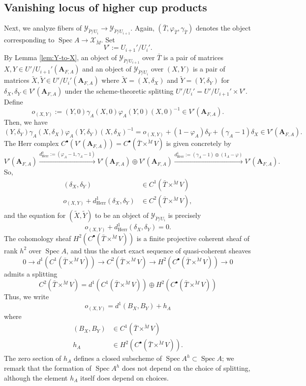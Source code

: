 \documentclass[11pt]{amsart}
\numberwithin{thm}{section}
\numberwithin{lem}{section}
\numberwithin{cor}{section}
\numberwithin{prop}{section}
\numberwithin{exam}{section}
\numberwithin{dfn}{section}
\newcommand{\wt}[1]{\widetilde{#1}}
\newcommand{\Herr}{{\operatorname{Herr}}}
\newcommand{\spec}{\operatorname{Spec}}
\newcommand{\cX}{\mathcal{X}}
\newcommand{\cY}{\mathcal{Y}}
\newcommand{\bM}{\breve{M}}
\newcommand{\bP}{\breve{P}}
\newcommand{\A}{\mathbf{A}}
\begin{document}
\subsection{Vanishing locus of higher cup products}
Next, we analyze fibers of
$\cY_{\bP/U_i}\to \cY_{\bP/U_{i+1}}$.
Again, $(\bar T, \varphi_{\bar T}, \gamma_{\bar T})$
denotes the object corresponding to
$\spec A\to \cX_{\bM}$.
Set \[
V':=U_{i+1}'/U_i'.\]
By Lemma \ref{lem:Y-to-X},
an object 
of $\cY_{\bP/U_{i+1}}$ over $\bar T$
is a pair of matrices
$X, Y\in U'/U_{i+1}'(\A_{F,A})$
and
an object 
of $\cY_{\bP/U_{i}}$ over $(X, Y)$
is a pair of matrices
$\wt X, \wt Y\in U'/U_{i}'(\A_{F,A})$
where
$\wt X=(X, \delta_X)$
and
$\wt Y=(Y, \delta_Y)$
for $\delta_X, \delta_Y\in V'(\A_{F, A})$
under the scheme-theoretic splitting
$U'/U_{i}'=U'/U_{i+1}'\times V'$.
Define
\[
o_{(X,Y)}:=
(Y,0)\gamma_A(X,0)
\varphi_A(Y,0)
(X,0)^{-1}
\in V'(\A_{F,A}).
\]
Then, we have
\[
(Y,\delta_Y)\gamma_A(X,\delta_X)
\varphi_A(Y,\delta_Y)
(X,\delta_X)^{-1}
=o_{(X,Y)}
+
(1-\varphi_A)\delta_Y
+(\gamma_A-1)\delta_X
\in V'(\A_{F,A}).
\]
The Herr complex
$C^\bullet(V'(\A_{F,A}))
=C^\bullet(\bar T\times^{\bM}V)$
is given concretely by
\[
V'(\A_{F,A})
\xrightarrow{d^0_\Herr:=(\varphi_A-1, \gamma_A-1)}
V'(\A_{F,A})
\oplus 
V'(\A_{F,A})
\xrightarrow{d^1_\Herr:=(\gamma_A-1)\oplus(1_A-\varphi)}
V'(\A_{F,A}).
\]
So,
\begin{align*}
(\delta_X,\delta_Y)
&\in C^1(\bar T\times^{\bM}V)
\\
o_{(X,Y)}
+
d^1_\Herr(\delta_X, \delta_Y)
&\in
C^2(\bar T\times^{\bM}V),
\end{align*}
and
the equation for
$(\wt X, \wt Y)$
to be an object of
$\cY_{\bP/U_i}$
is precisely
\[
o_{(X,Y)}+ d^1_\Herr(\delta_X, \delta_Y)=0.
\]
The cohomology sheaf
$H^2(C^\bullet(\bar T\times^{\bM}V))$
is a finite projective coherent sheaf
of rank $h^2$
over $\spec A$,
and thus
the short exact sequence of quasi-coherent sheaves
\[
0\to
d^1(C^1(\bar T\times^{\bM}V))
\to
C^2(\bar T\times^{\bM}V)
\to
H^2(C^\bullet(\bar T\times^{\bM}V))
\to 0
\]
admits a splitting
\[
C^2(\bar T\times^{\bM}V)
=
d^1(C^1(\bar T\times^{\bM}V))
\oplus
H^2(C^\bullet(\bar T\times^{\bM}V))
\]
Thus, we write
\[
o_{(X,Y)}
=d^1(B_X, B_Y)
+h_A
\]
where
\begin{align*}
(B_X, B_Y) &\in C^1(\bar T\times^{\bM}V)\\
h_A &\in H^2(C^\bullet(\bar T\times^{\bM}V)).
\end{align*}
The zero section of $h_A$
defines a closed subscheme of $\spec A^h\subset \spec A$;
we remark that the formation
of $\spec A^h$
does not depend on the choice of splitting,
although the element $h_A$
itself does depend on choices.
\end{document}
